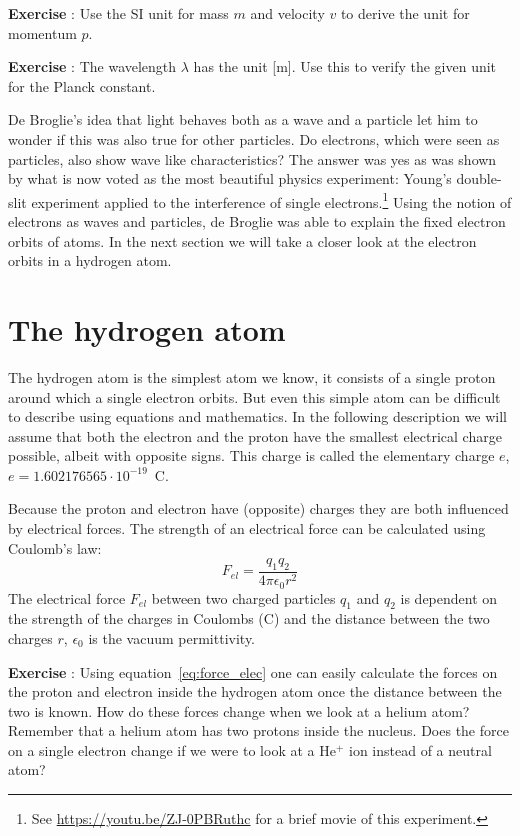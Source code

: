\documentclass[12pt,a4paper]{article}
\numberwithin{equation}{section}
\numberwithin{figure}{section}
\newcounter{Exercise}
\numberwithin{table}{section}
\begin{document}
\begin{shaded} \textbf{Exercise \theExercise {}} : Use the SI unit for mass $m$ and velocity $v$ to derive the unit for momentum $p$. \end{shaded}
\begin{shaded} \textbf{Exercise \theExercise {}} : The wavelength $\lambda$ has the unit [m]. Use this to verify the given unit for the Planck constant. \end{shaded}

De Broglie's idea that light behaves both as a wave and a particle let him to wonder if this was also true for other particles. Do electrons, which were seen as particles, also show wave like characteristics? The answer was yes as was shown by what is now voted as the most beautiful physics experiment: Young's double-slit experiment applied to the interference of single electrons.\footnote{See \url{https://youtu.be/ZJ-0PBRuthc} for a brief movie of this experiment.} Using the notion of electrons as waves and particles, de Broglie was able to explain the fixed electron orbits of atoms. In the next section we will take a closer look at the electron orbits in a hydrogen atom.

\section{The hydrogen atom}
The hydrogen atom is the simplest atom we know, it consists of a single proton around which a single electron orbits. But even this simple atom can be difficult to describe using equations and mathematics. In the following description we will assume that both the electron and the proton have the smallest electrical charge possible, albeit with opposite signs. This charge is called the elementary charge $e$, $e=1.602176565 \cdot 10^{-19}$~C.

Because the proton and electron have (opposite) charges they are both influenced by electrical forces. The strength of an electrical force can be calculated using Coulomb's law:
\begin{equation}
F_{el} = \frac{q_1 q_2}{4 \pi \epsilon_0 r^2} \label{eq:force_elec} 
\end{equation}
The electrical force $F_{el}$ between two charged particles $q_1$ and $q_2$ is dependent on the strength of the charges in Coulombs (C) and the distance between the two charges $r$, $\epsilon_0$ is the vacuum permittivity. 

\begin{shaded} \textbf{Exercise \theExercise {}} : Using equation~\ref{eq:force_elec} one can easily calculate the forces on the proton and electron inside the hydrogen atom once the distance between the two is known. How do these forces change when we look at a helium atom? Remember that a helium atom has two protons inside the nucleus. Does the force on a single electron change if we were to look at a He$^+$ ion instead of a neutral atom?\end{shaded}
\end{document}
